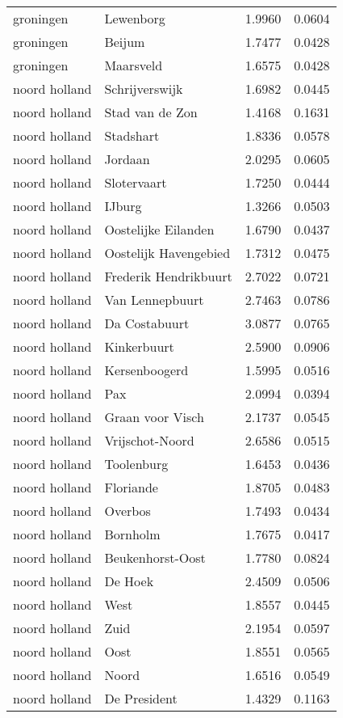 \begin{longtable}{llcc}
groningen & Lewenborg & 1.9960 & 0.0604 \\
groningen & Beijum & 1.7477 & 0.0428 \\
groningen & Maarsveld & 1.6575 & 0.0428 \\
noord holland & Schrijverswijk & 1.6982 & 0.0445 \\
noord holland & Stad van de Zon & 1.4168 & 0.1631 \\
noord holland & Stadshart & 1.8336 & 0.0578 \\
noord holland & Jordaan & 2.0295 & 0.0605 \\
noord holland & Slotervaart & 1.7250 & 0.0444 \\
noord holland & IJburg & 1.3266 & 0.0503 \\
noord holland & Oostelijke Eilanden & 1.6790 & 0.0437 \\
noord holland & Oostelijk Havengebied & 1.7312 & 0.0475 \\
noord holland & Frederik Hendrikbuurt & 2.7022 & 0.0721 \\
noord holland & Van Lennepbuurt & 2.7463 & 0.0786 \\
noord holland & Da Costabuurt & 3.0877 & 0.0765 \\
noord holland & Kinkerbuurt & 2.5900 & 0.0906 \\
noord holland & Kersenboogerd & 1.5995 & 0.0516 \\
noord holland & Pax & 2.0994 & 0.0394 \\
noord holland & Graan voor Visch & 2.1737 & 0.0545 \\
noord holland & Vrijschot-Noord & 2.6586 & 0.0515 \\
noord holland & Toolenburg & 1.6453 & 0.0436 \\
noord holland & Floriande & 1.8705 & 0.0483 \\
noord holland & Overbos & 1.7493 & 0.0434 \\
noord holland & Bornholm & 1.7675 & 0.0417 \\
noord holland & Beukenhorst-Oost & 1.7780 & 0.0824 \\
noord holland & De Hoek & 2.4509 & 0.0506 \\
noord holland & West & 1.8557 & 0.0445 \\
noord holland & Zuid & 2.1954 & 0.0597 \\
noord holland & Oost & 1.8551 & 0.0565 \\
noord holland & Noord & 1.6516 & 0.0549 \\
noord holland & De President & 1.4329 & 0.1163 \\

\end{longtable}
